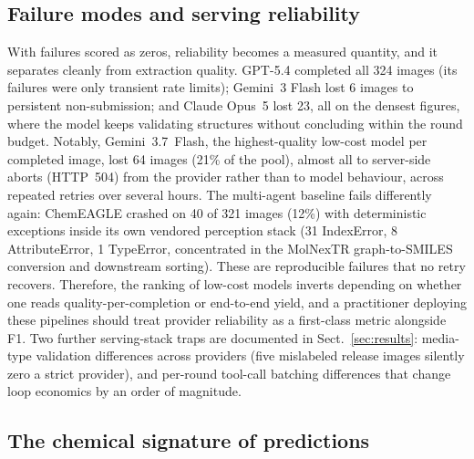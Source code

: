 \documentclass{article}
\begin{document}
\subsection{Failure modes and serving reliability}
\label{sec:failures}
With failures scored as zeros, reliability becomes a measured quantity,
and it separates cleanly from extraction quality. GPT-5.4 completed all
324 images (its failures were only transient rate limits); Gemini~3
Flash lost 6 images to persistent non-submission; and Claude Opus~5
lost 23, all on the densest figures, where the model keeps validating
structures without concluding within the round budget. Notably,
Gemini~3.7~Flash, the highest-quality low-cost model per completed
image, lost 64 images (21\% of the pool), almost all to server-side
aborts (HTTP~504) from the provider rather than to model behaviour,
across repeated retries over several hours. The multi-agent baseline
fails differently again: ChemEAGLE crashed on 40 of 321 images (12\%)
with deterministic exceptions inside its own vendored perception stack
(31 IndexError, 8 AttributeError, 1 TypeError, concentrated in the
MolNexTR graph-to-SMILES conversion and downstream sorting). These are
reproducible failures that no retry recovers. Therefore,
the ranking of low-cost models inverts depending on whether one reads
quality-per-completion or end-to-end yield, and a practitioner
deploying these pipelines should treat provider reliability as a
first-class metric alongside F1. Two further serving-stack traps are
documented in Sect.~\ref{sec:results}: media-type validation
differences across providers (five mislabeled release images silently
zero a strict provider), and per-round tool-call batching differences
that change loop economics by an order of magnitude.

\subsection{The chemical signature of predictions}
\label{sec:predchem}
\end{document}
